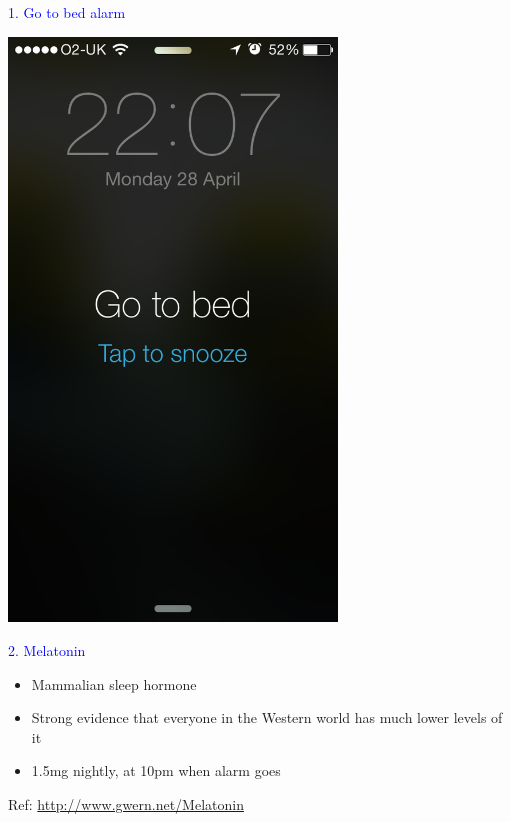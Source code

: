 \documentclass[landscape]{slides}
\begin{document}
\begin{slide}

    \textcolor{blue}{\Large{1. Go to bed alarm}}

    \begin{center}
        \includegraphics[height=15.5cm]{go-to-bed-alarm}
    \end{center}

\end{slide}


\begin{slide}

    \textcolor{blue}{\Large{2. Melatonin}}

    \begin{itemize}
        \item Mammalian sleep hormone
        \item Strong evidence that everyone in the Western world has much lower levels of it
        \item 1.5mg nightly, at 10pm when alarm goes
    \end{itemize}

    \small{Ref: \url{http://www.gwern.net/Melatonin}}

\end{slide}
\end{document}
